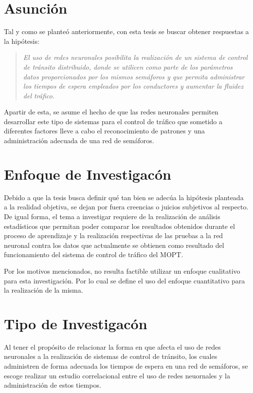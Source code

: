 \section{Asunci\'{o}n}

Tal y como se plante\'{o} anteriormente, con esta tesis se buscar obtener
respuestas a la hip\'{o}tesis:

\begin{quote}
	\textit{El uso de redes neuronales posibilita la realizaci\'{o}n de un sistema
de control de tr\'{a}nsito distribuido, donde se utilicen como parte de los par\'{a}metros datos
proporcionados por los mismos sem\'{a}foros y que permita administrar los tiempos de
espera empleados por los conductores y aumentar la fluidez del tr\'{a}fico.}
\end{quote}

	Apartir de esta, se asume el hecho de que las redes neuronales permiten
desarrollar este tipo de sistemas para el control de tr\'{a}fico que sometido a
diferentes factores lleve a cabo el reconocimiento de patrones y una
administraci\'{o}n adecuada de una red de sem\'{a}foros.

\section{Enfoque de Investigac\'{o}n}

	
	Debido a que la tesis busca definir qu\'{e} tan bien se adec\'{u}a la
	hip\'{o}tesis planteada a la realidad objetiva, se dejan por fuera creencias o juicios
subjetivos al respecto. De igual forma, el tema a investigar requiere de la
realizaci\'{o}n de an\'{a}lisis estad\'{i}sticos que permitan poder comparar
los resultados obtenidos durante el proceso de aprendizaje y la realizaci\'{o}n
respectivas de las pruebas a la red neuronal contra los datos que actualmente
se obtienen como resultado del funcionamiento del sistema de control de
tr\'{a}fico del MOPT.
	
	Por los motivos mencionados, no resulta factible utilizar un enfoque
cualitativo para esta investigaci\'{o}n. Por lo cual se define el uso del
enfoque cuantitativo para la realizaci\'{o}n de la misma.

\section{Tipo de Investigac\'{o}n}


	Al tener el prop\'{o}sito de relacionar la forma en que afecta el uso de
redes neuronales a la realizaci\'{o}n de sistemas de control de tr\'{a}nsito,
los cuales administren de forma adecuada los tiempos de espera en una red
de sem\'{a}foros, se escoge realizar un estudio correlacional entre el uso de
redes neuornales y la administraci\'{o}n de estos tiempos.

